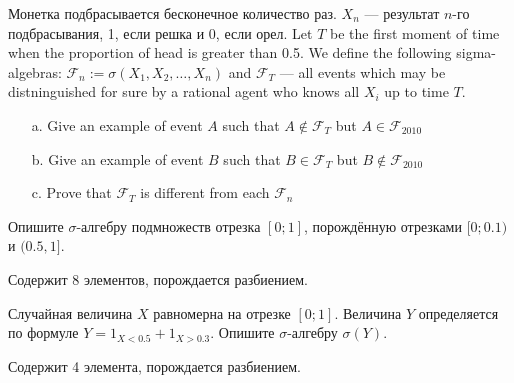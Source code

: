 \begin{problem}
Монетка подбрасывается бесконечное количество раз. $ X_{n} $ — результат $ n $-го подбрасывания, 1, если решка и 0, если орел. Let $T$ be the first moment of time when the proportion of head is greater than 0.5. We define the following sigma-algebras: $ \mathcal{F}_{n}:=\sigma(X_{1},X_{2},\ldots,X_{n})$ and $ \mathcal{F}_{T} $ — all events which may be distninguished for sure by a rational agent who knows all $ X_{i} $ up to time $ T $.
\begin{itemize}
\item[a.] Give an example of event $A$ such that $ A\notin \mathcal{F}_{T} $ but $ A\in \mathcal{F}_{2010} $
\item[b.] Give an example of event $B$ such that $ B\in \mathcal{F}_{T} $ but $ B\notin \mathcal{F}_{2010} $
\item[c.] Prove that $ \mathcal{F}_{T} $ is different from each $ \mathcal{F}_{n} $
\end{itemize}


\begin{sol}

\end{sol}
\end{problem}

\begin{problem}
Опишите $\sigma$-алгебру подмножеств отрезка $[0;1]$, порождённую отрезками $[0;0.1)$ и $(0.5,1]$.

\begin{sol}
Содержит 8 элементов, порождается разбиением.
\end{sol}
\end{problem}

\begin{problem}
Случайная величина $X$ равномерна на отрезке $[0;1]$. Величина $Y$ определяется по формуле $Y=1_{X<0.5}+1_{X>0.3}$. Опишите $\sigma$-алгебру $\sigma(Y)$.

\begin{sol}
Содержит 4 элемента, порождается разбиением.
\end{sol}
\end{problem}


